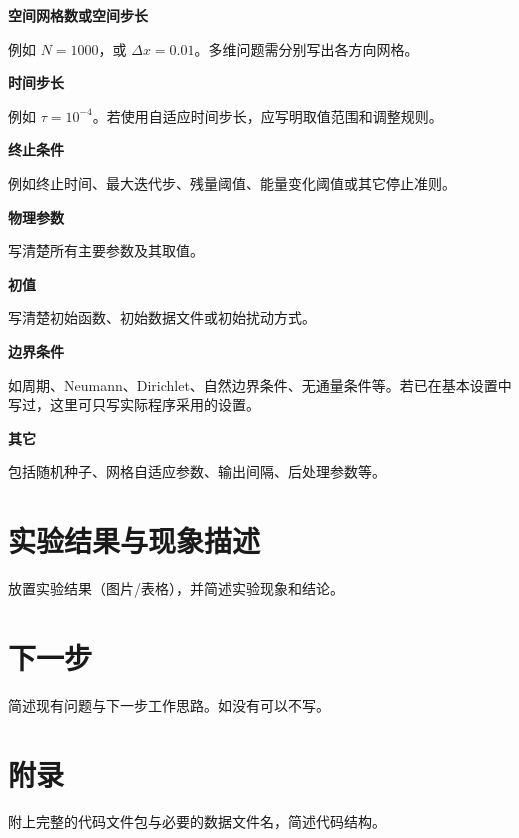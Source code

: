 \documentclass[UTF8,a4paper,11pt]{ctexart}
\newcommand{\hint}[1]{{\small\color{midgray}#1}\par}
\begin{document}
\noindent\textbf{空间网格数或空间步长}\par
\hint{例如 $N=1000$，或 $\Delta x=0.01$。多维问题需分别写出各方向网格。}
\vspace{1.0em}

\noindent\textbf{时间步长}\par
\hint{例如 $\tau=10^{-4}$。若使用自适应时间步长，应写明取值范围和调整规则。}
\vspace{1.0em}

\noindent\textbf{终止条件}\par
\hint{例如终止时间、最大迭代步、残量阈值、能量变化阈值或其它停止准则。}
\vspace{1.0em}

\noindent\textbf{物理参数}\par
\hint{写清楚所有主要参数及其取值。}
\vspace{1.2em}

\noindent\textbf{初值}\par
\hint{写清楚初始函数、初始数据文件或初始扰动方式。}
\vspace{1.0em}

\noindent\textbf{边界条件}\par
\hint{如周期、Neumann、Dirichlet、自然边界条件、无通量条件等。若已在基本设置中写过，这里可只写实际程序采用的设置。}
\vspace{1.0em}

\noindent\textbf{其它}\par
\hint{包括随机种子、网格自适应参数、输出间隔、后处理参数等。}
\vspace{1.0em}

\section{实验结果与现象描述}
\hint{放置实验结果（图片/表格），并简述实验现象和结论。}

\vspace{2cm}


\section{下一步}
\hint{简述现有问题与下一步工作思路。如没有可以不写。}

\vspace{2cm}

\section{附录}
\hint{附上完整的代码文件包与必要的数据文件名，简述代码结构。}
\end{document}
